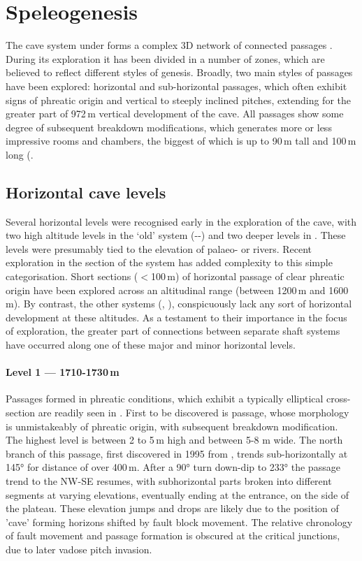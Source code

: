  \section{Speleogenesis}
The cave system under  forms a complex 3D network of connected passages .
 During its exploration it has been divided in a number of zones, which are believed to reflect different styles of genesis. Broadly, two main styles of passages have been explored: horizontal and sub-horizontal passages, which often exhibit signs of phreatic origin and vertical to steeply inclined pitches, extending for the greater part of 972\,m vertical development of the cave. 
 All passages show some degree of subsequent breakdown modifications, which generates more or less impressive rooms and chambers, the biggest of which is up to 90\,m tall and 100\,m long (.

\subsection{Horizontal cave levels}
Several horizontal levels were recognised early in the exploration of the cave, with two high altitude levels in the ‘old’ system (--) and two deeper levels in . 
These levels were presumably tied to the elevation of palaeo- or  rivers. 
Recent exploration in the  section of the system has added complexity to this simple categorisation. 
Short sections ($<$100\,m) of horizontal passage of clear phreatic origin have been explored across an altitudinal range (between 1200\,m and 1600\,m). 
By contrast, the other systems (, ), conspicuously lack any sort of horizontal development at these altitudes. 
As a testament to their importance in the focus of exploration, the greater part of connections between separate shaft systems have occurred along one of these major and minor horizontal levels.

\paragraph{Level 1 — 1710-1730\,m}
Passages formed in phreatic conditions, which exhibit a typically elliptical cross-section are readily seen in . 
First to be discovered is  passage, whose morphology is unmistakeably of phreatic origin, with subsequent breakdown modification. 
The highest level is between 2 to 5\,m high and between 5-8 m wide. 
The north branch of this passage, first discovered in 1995 from , trends sub-horizontally at 145° for distance of over 400\,m. 
After a 90° turn down-dip to 233° the passage trend to the NW-SE resumes, with subhorizontal parts broken into different segments at varying elevations, eventually ending at the  entrance, on the side of the plateau. 
These elevation jumps and drops are likely due to the position of ’cave’ forming horizons shifted by fault block movement. 
The relative chronology of fault movement and passage formation is obscured at the critical junctions, due to later vadose pitch invasion. 

